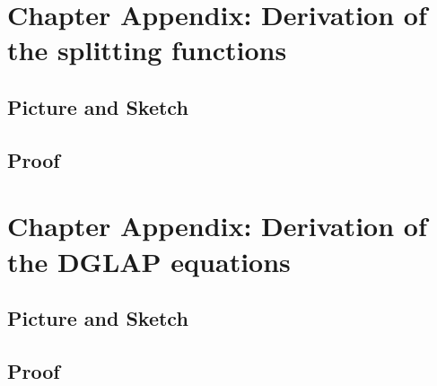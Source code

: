 \section*{Chapter Appendix: Derivation of the splitting functions}

\subsection{Picture and Sketch}

\subsection{Proof}


\section*{Chapter Appendix: Derivation of the DGLAP equations}

\subsection{Picture and Sketch}

\subsection{Proof}
